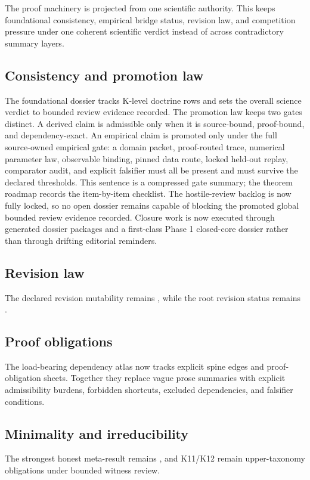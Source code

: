 The proof machinery is projected from one scientific authority. This keeps foundational consistency, empirical bridge status, revision law, and competition pressure under one coherent scientific verdict instead of across contradictory summary layers.

\subsection{Consistency and promotion law}
The foundational dossier tracks  K-level doctrine rows and sets the overall science verdict to bounded review evidence recorded.
The promotion law keeps two gates distinct. A derived claim is admissible only when it is source-bound, proof-bound, and dependency-exact. An empirical claim is promoted only under the full source-owned empirical gate: a domain packet, proof-routed trace, numerical parameter law, observable binding, pinned data route, locked held-out replay, comparator audit, and explicit falsifier must all be present and must survive the declared thresholds. This sentence is a compressed gate summary; the theorem roadmap records the item-by-item checklist.
The hostile-review backlog is now fully locked, so no open dossier remains capable of blocking the promoted global bounded review evidence recorded.
Closure work is now executed through generated dossier packages and a first-class Phase 1 closed-core dossier rather than through drifting editorial reminders.

\subsection{Revision law}
The declared revision mutability remains , while the root revision status remains .

\subsection{Proof obligations}
The load-bearing dependency atlas now tracks  explicit spine edges and  proof-obligation sheets. Together they replace vague prose summaries with explicit admissibility burdens, forbidden shortcuts, excluded dependencies, and falsifier conditions.

\subsection{Minimality and irreducibility}
The strongest honest meta-result remains , and K11/K12 remain upper-taxonomy obligations under bounded witness review.

